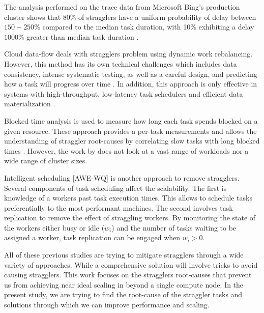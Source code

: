 The analysis performed on the trace data from Microsoft Bing's production cluster shows that $80\%$ of stragglers have a uniform probability of delay between $150-250\%$ 
compared to the median task duration, with 10\% exhibiting a delay $1000\%$ greater than median task duration \cite{Ananthanarayanan2010}.

Cloud data-flow deals with stragglers problem using dynamic work rebalancing. 
However, this method has its own technical challenges which includes data consistency, intense systematic testing, as well as a careful design, and predicting how a task will progress over time \cite{Schmidt2016}.
In addition, this approach is only effective in systems with high-throughput, low-latency task schedulers and efficient data materialization \cite{Rosen2012}.

Blocked time analysis is used to measure how long each task spends blocked on a given resource. 
These approach provides a per-task measurements and allows the understanding of straggler root-causes by correlating slow tasks with long blocked times \cite{Ousterhout2015}. 
However, the work by \cite{Ousterhout2015} does not look at a vast range of workloads nor a wide range of cluster sizes.

Intelligent scheduling [AWE-WQ] is another approach to remove stragglers. Several components of task scheduling affect the scalability.
The first is knowledge of a worker\textsc{}s past task execution times. This allows to schedule tasks preferentially to the most performant machines. 
The second involves task replication to remove the effect of straggling workers. 
By monitoring the state of the workers either busy or idle ($w_{i}$) and the number of tasks waiting to be assigned a worker, task replication can be engaged when $w_{i}>0$.

All of these previous studies are trying to mitigate stragglers through a wide variety of approaches.
While a comprehensive solution will involve tricks to avoid causing stragglers. 
This work focuses on the stragglers root-causes that prevent us from achieving near ideal scaling in  beyond a single compute node.
In the present study, we are trying to find the root-cause of the straggler tasks and solutions through which we can improve performance and scaling.

